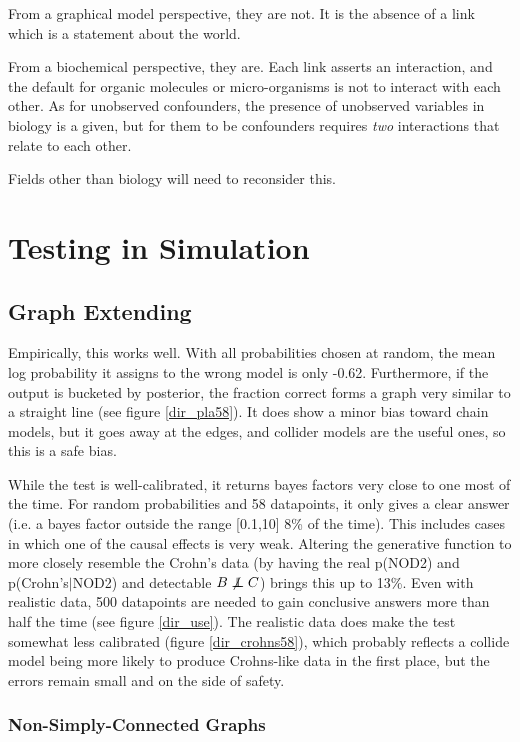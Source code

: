 \documentclass[letterpaper]{article}
\newcommand\indep{\protect\mathpalette{\protect\independenT}{\perp}}
\def\independenT#1#2{\mathrel{\rlap{$#1#2$}\mkern2mu{#1#2}}}
\begin{document}
From a graphical model perspective, they are not.  It is the absence
of a link which is a statement about the world.

From a biochemical perspective, they are.  Each link asserts an
interaction, and the default for organic molecules or micro-organisms
is not to interact with each other.  As for unobserved confounders, the
presence of unobserved variables in biology is a given, but for them
to be confounders requires \textit{two} interactions that relate to
each other.

Fields other than biology will need to reconsider this.

\section{Testing in Simulation}

\subsection{Graph Extending}

Empirically, this
works well.  With all probabilities chosen at random, the mean log
probability it assigns to the wrong model is only -0.62.  Furthermore,
if the output is bucketed by posterior, the fraction correct forms a
graph very similar to a straight line (see figure \ref{dir_pla58}).
It does show a minor bias toward chain models, but it goes away at the
edges, and collider models are the useful ones, so this is a safe bias.

While the test is well-calibrated, it returns bayes factors very close
to one most of the time.  For random probabilities and 58 datapoints,
it only gives a clear answer (i.e. a bayes factor outside the range
[0.1,10] 8\% of the time).  This includes cases in which one of the
causal effects is very weak.  Altering the generative function to more
closely resemble the Crohn's data (by having the real p(NOD2) and
p(Crohn's$|$NOD2) and detectable $B\not\indep C$) brings this up to
13\%.  Even with realistic data, 500 datapoints are needed to gain
conclusive answers more than half the time (see figure
\ref{dir_use}).  The realistic data does make the test somewhat less
calibrated (figure \ref{dir_crohns58}), which probably reflects a
collide model being more likely to produce Crohns-like data in the
first place, but the errors remain small and on the side of safety.

\subsubsection{Non-Simply-Connected Graphs}
\end{document}
